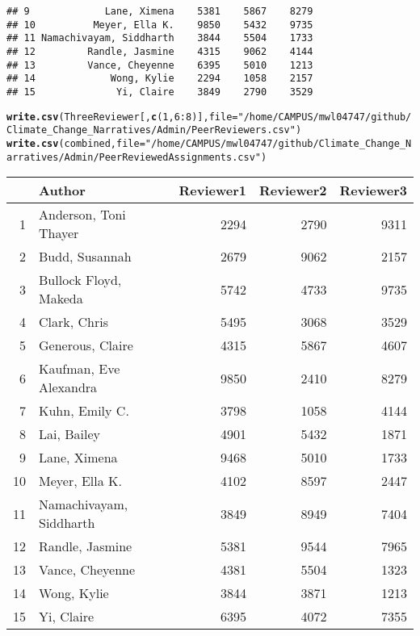 \documentclass{tufte-handout}\usepackage[]{graphicx}\usepackage[]{color}
\makeatletter
\newcommand{\hlnum}[1]{\textcolor[rgb]{0.686,0.059,0.569}{#1}}%
\newcommand{\hlstr}[1]{\textcolor[rgb]{0.192,0.494,0.8}{#1}}%
\newcommand{\hlopt}[1]{\textcolor[rgb]{0,0,0}{#1}}%
\newcommand{\hlstd}[1]{\textcolor[rgb]{0.345,0.345,0.345}{#1}}%
\newcommand{\hlkwc}[1]{\textcolor[rgb]{0.333,0.667,0.333}{#1}}%
\newcommand{\hlkwd}[1]{\textcolor[rgb]{0.737,0.353,0.396}{\textbf{#1}}}%
\newenvironment{kframe}{%
 \def\at@end@of@kframe{}%
 \ifinner\ifhmode%
  \def\at@end@of@kframe{\end{minipage}}%
  \begin{minipage}{\columnwidth}%
 \fi\fi%
 \def\FrameCommand##1{\hskip\@totalleftmargin \hskip-\fboxsep
 \colorbox{shadecolor}{##1}\hskip-\fboxsep
     \hskip-\linewidth \hskip-\@totalleftmargin \hskip\columnwidth}%
 \MakeFramed {\advance\hsize-\width
   \@totalleftmargin\z@ \linewidth\hsize
   \@setminipage}}%
 {\par\unskip\endMakeFramed%
 \at@end@of@kframe}
\newenvironment{knitrout}{}{} %
\makeatother
\begin{document}
\begin{knitrout}
\begin{kframe}
\begin{verbatim}
## 9             Lane, Ximena    5381    5867    8279
## 10          Meyer, Ella K.    9850    5432    9735
## 11 Namachivayam, Siddharth    3844    5504    1733
## 12         Randle, Jasmine    4315    9062    4144
## 13         Vance, Cheyenne    6395    5010    1213
## 14             Wong, Kylie    2294    1058    2157
## 15              Yi, Claire    3849    2790    3529
\end{verbatim}
\begin{alltt}
\hlkwd{write.csv}\hlstd{(ThreeReviewer[,}\hlkwd{c}\hlstd{(}\hlnum{1}\hlstd{,}\hlnum{6}\hlopt{:}\hlnum{8}\hlstd{)],} \hlkwc{file} \hlstd{=} \hlstr{"/home/CAMPUS/mwl04747/github/Climate_Change_Narratives/Admin/PeerReviewers.csv"}\hlstd{)}
\hlkwd{write.csv}\hlstd{(combined,} \hlkwc{file} \hlstd{=} \hlstr{"/home/CAMPUS/mwl04747/github/Climate_Change_Narratives/Admin/PeerReviewedAssignments.csv"}\hlstd{)}
\end{alltt}
\end{kframe}
\end{knitrout}


\begin{table}[ht]
\centering
\begin{tabular}{rlrrr}
  \hline
 & Author & Reviewer1 & Reviewer2 & Reviewer3 \\ 
  \hline
1 & Anderson, Toni Thayer & 2294 & 2790 & 9311 \\ 
  2 & Budd, Susannah & 2679 & 9062 & 2157 \\ 
  3 & Bullock Floyd, Makeda & 5742 & 4733 & 9735 \\ 
  4 & Clark, Chris & 5495 & 3068 & 3529 \\ 
  5 & Generous, Claire & 4315 & 5867 & 4607 \\ 
  6 & Kaufman, Eve Alexandra & 9850 & 2410 & 8279 \\ 
  7 & Kuhn, Emily C. & 3798 & 1058 & 4144 \\ 
  8 & Lai, Bailey & 4901 & 5432 & 1871 \\ 
  9 & Lane, Ximena & 9468 & 5010 & 1733 \\ 
  10 & Meyer, Ella K. & 4102 & 8597 & 2447 \\ 
  11 & Namachivayam, Siddharth & 3849 & 8949 & 7404 \\ 
  12 & Randle, Jasmine & 5381 & 9544 & 7965 \\ 
  13 & Vance, Cheyenne & 4381 & 5504 & 1323 \\ 
  14 & Wong, Kylie & 3844 & 3871 & 1213 \\ 
  15 & Yi, Claire & 6395 & 4072 & 7355 \\ 
   \hline
\end{tabular}
\end{table}
\end{document}
